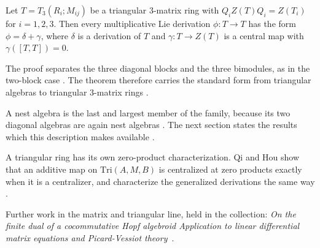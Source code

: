 \begin{theorem}\label{thm:generalized:three-matrix}
Let $T=T_3(R_i;M_{ij})$ be a triangular $3$-matrix ring with
$Q_iZ(T)Q_i=Z(T_i)$ for $i=1,2,3$. Then every multiplicative Lie derivation
$\phi\colon T\to T$ has the form $\phi=\delta+\gamma$, where $\delta$ is a
derivation of $T$ and $\gamma\colon T\to Z(T)$ is a central map with
$\gamma([T,T])=0$.
\end{theorem}

The proof separates the three diagonal blocks and the three bimodules, as in the
two-block case \cite[pp.~5--6]{ChenHou2020}. The theorem therefore carries the
standard form from triangular algebras to triangular $3$-matrix rings
\cite[p.~5]{ChenHou2020}.

A nest algebra is the last and largest member of the family, because its two
diagonal algebras are again nest algebras
\cite[Proposition~19, p.~308]{Cheung2003}. The next section states the results
which this description makes available \cite[p.~308]{Cheung2003}.

A triangular ring has its own zero-product characterization. Qi and Hou show
that an additive map on $\mathrm{Tri}(A,M,B)$ is centralized at zero products
exactly when it is a centralizer, and characterize the generalized derivations the
same way \cite[Abstract]{QiHou2013Centralizers}.

Further work in the matrix and triangular line, held in the collection:
\noindent\emph{On the finite dual of a cocommutative Hopf algebroid Application to linear differential matrix equations and Picard-Vessiot theory}~\cite{LibOnTheFiniteDual2021}.
